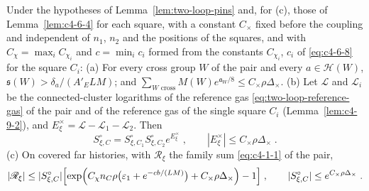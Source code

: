 \begin{lemma}\label{lem:two-loop-cross}
Under the hypotheses of Lemma~\ref{lem:two-loop-pins} and, for (c), those of Lemma~\ref{lem:c4-6-4} for each square, with a constant $C_\times$ fixed before the coupling and independent of $n_1$, $n_2$ and the positions of the squares, and with $C_\chi=\max_iC_{\chi_i}$ and $c=\min_ic_i$ formed from the constants $C_{\chi_i}$, $c_i$ of \eqref{eq:c4-6-8} for the square $C_i$:
(a) For every cross group $W$ of the pair and every $a\in\mathcal H(W)$, $\mathfrak s(W)>\delta_a/(A'_ELM)$; and $\sum_{W\text{ cross}}M(W)e^{\mathfrak a_W/8}\leq C_\times\rho\Delta_\times$.
(b) Let $\mathscr L$ and $\mathscr L_i$ be the connected-cluster logarithms of the reference gas \eqref{eq:two-loop-reference-gas} of the pair and of the reference gas of the single square $C_i$ (Lemma~\ref{lem:c4-9-2}), and $E^\times_\xi=\mathscr L-\mathscr L_1-\mathscr L_2$. Then
\begin{equation}\label{eq:two-loop-factorisation}
    S^\circ_{\xi,C}=S^\circ_{\xi,C_1}S^\circ_{\xi,C_2}e^{E^\times_\xi}\;,\qquad|E^\times_\xi|\leq C_\times\rho\Delta_\times\;.
\end{equation}
(c) On covered far histories, with $\mathscr R_\xi$ the family sum \eqref{eq:c4-1-1} of the pair,
\begin{equation}\label{eq:two-loop-family-sum}
    |\mathscr R_\xi|\leq|S^\circ_{\xi,C}|\Bigl[\exp\Bigl(C_\chi n_C\rho\bigl(\varepsilon_1+e^{-cb/(LM)}\bigr)+C_\times\rho\Delta_\times\Bigr)-1\Bigr]\;,\qquad|S^\circ_{\xi,C}|\leq e^{C_\times\rho\Delta_\times}\;.
\end{equation}
\end{lemma}

